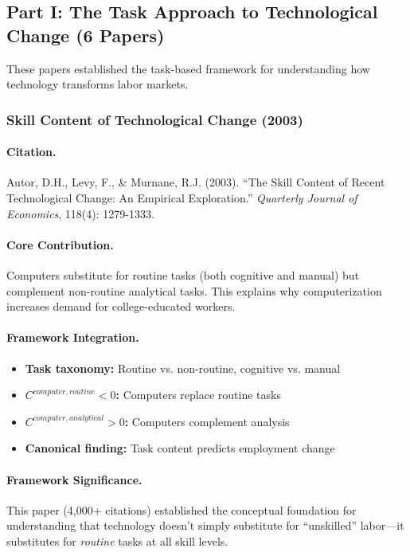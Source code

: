 \documentclass[12pt,a4paper]{article}
\begin{document}
\subsection{Part I: The Task Approach to Technological Change (6 Papers)}

These papers established the task-based framework for understanding how
technology transforms labor markets.

\subsubsection{Skill Content of Technological Change (2003)}

\paragraph{Citation.}
Autor, D.H., Levy, F., \& Murnane, R.J. (2003). ``The Skill Content of Recent
Technological Change: An Empirical Exploration.''
\emph{Quarterly Journal of Economics}, 118(4): 1279-1333.

\paragraph{Core Contribution.}
Computers substitute for routine tasks (both cognitive and manual) but
complement non-routine analytical tasks. This explains why computerization
increases demand for college-educated workers.

\paragraph{Framework Integration.}
\begin{itemize}
  \item \textbf{Task taxonomy:} Routine vs. non-routine, cognitive vs. manual
  \item \textbf{$C^{computer,routine} < 0$:} Computers replace routine tasks
  \item \textbf{$C^{computer,analytical} > 0$:} Computers complement analysis
  \item \textbf{Canonical finding:} Task content predicts employment change
\end{itemize}

\paragraph{Framework Significance.}
This paper (4,000+ citations) established the conceptual foundation for
understanding that technology doesn't simply substitute for ``unskilled''
labor---it substitutes for \emph{routine} tasks at all skill levels.
\end{document}
